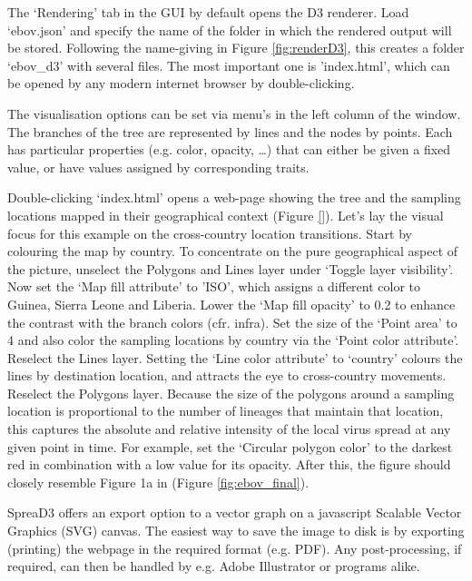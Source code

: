 \documentclass[english]{paper}
\begin{document}
The `Rendering' tab in the GUI by default opens the D3 renderer.
Load `ebov.json' and specify the name of the folder in which the rendered output will be stored. %
Following the name-giving in Figure \ref{fig:renderD3}, this creates a folder `ebov\_d3' with several files.
The most important one is 'index.html', which can be opened by any modern internet browser by double-clicking. 
\par
The visualisation options can be set via menu's in the left column of the window.
The branches of the tree are represented by lines and the nodes by points. %
Each has particular properties (e.g. color, opacity, \dots) that can either be given a fixed value, or have values assigned by corresponding traits.
\par
Double-clicking `index.html' opens a web-page showing the tree and the sampling locations mapped in their geographical context (Figure \ref{}). 
Let's lay the visual focus for this example on the cross-country location transitions.
Start by colouring the map by country. 
To concentrate on the pure geographical aspect of the picture, unselect the Polygons and Lines layer under `Toggle layer visibility'.
Now set the `Map fill attribute' to 'ISO', which assigns a different color to Guinea, Sierra Leone and Liberia.
Lower the `Map fill opacity' to 0.2 to enhance the contrast with the branch colors (cfr. infra).
Set the size of the `Point area' to 4 and also color the sampling locations by country via the `Point color attribute'.
Reselect the Lines layer.
Setting the `Line color attribute' to `country' colours the lines by destination location, and attracts the eye to cross-country movements.
Reselect the Polygons layer.
Because the size of the polygons around a sampling location is proportional to the number of lineages that maintain that location, this captures the absolute and relative intensity of the local virus spread at any given point in time.
For example, set the `Circular polygon color'  to the darkest red in combination with a low value for its opacity. 
After this, the figure should closely resemble Figure 1a in \cite{Bielejec:2016aa} (Figure \ref{fig:ebov_final}).
\par
SpreaD3 offers an export option to a vector graph on a javascript Scalable Vector Graphics (SVG) canvas.
The easiest way to save the image to disk is by exporting (printing) the webpage in the required format (e.g. PDF).
Any post-processing, if required, can then be handled by e.g. Adobe Illustrator or programs alike.
\end{document}
